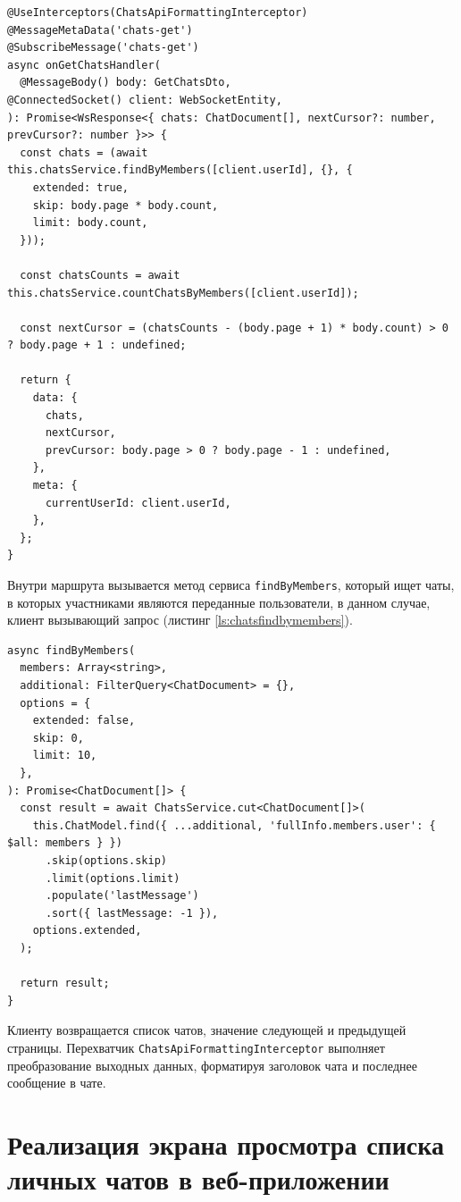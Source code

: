 \begin{lstlisting}[caption={Определение шлюза модуля, обеспечивающего работу с чатами}, label={ls:chatsget}]
@UseInterceptors(ChatsApiFormattingInterceptor)
@MessageMetaData('chats-get')
@SubscribeMessage('chats-get')
async onGetChatsHandler(
  @MessageBody() body: GetChatsDto,
@ConnectedSocket() client: WebSocketEntity,
): Promise<WsResponse<{ chats: ChatDocument[], nextCursor?: number, prevCursor?: number }>> {
  const chats = (await this.chatsService.findByMembers([client.userId], {}, {
    extended: true,
    skip: body.page * body.count,
    limit: body.count,
  }));

  const chatsCounts = await this.chatsService.countChatsByMembers([client.userId]);

  const nextCursor = (chatsCounts - (body.page + 1) * body.count) > 0 ? body.page + 1 : undefined;

  return {
    data: {
      chats,
      nextCursor,
      prevCursor: body.page > 0 ? body.page - 1 : undefined,
    },
    meta: {
      currentUserId: client.userId,
    },
  };
}
\end{lstlisting}

Внутри маршрута вызывается метод сервиса \verb|findByMembers|, который ищет чаты, в которых участниками являются переданные пользователи, в данном случае, клиент вызывающий запрос (листинг \ref{ls:chatsfindbymembers}).

\begin{lstlisting}[caption={Метод поиска чатов по переданным участникам}, label={ls:chatsfindbymembers}]
async findByMembers(
  members: Array<string>,
  additional: FilterQuery<ChatDocument> = {},
  options = {
    extended: false,
    skip: 0,
    limit: 10,
  },
): Promise<ChatDocument[]> {
  const result = await ChatsService.cut<ChatDocument[]>(
    this.ChatModel.find({ ...additional, 'fullInfo.members.user': { $all: members } })
      .skip(options.skip)
      .limit(options.limit)
      .populate('lastMessage')
      .sort({ lastMessage: -1 }),
    options.extended,
  );

  return result;
}
\end{lstlisting}

Клиенту возвращается список чатов, значение следующей и предыдущей страницы. Перехватчик \verb|ChatsApiFormattingInterceptor| выполняет преобразование выходных данных, форматируя заголовок чата и последнее сообщение в чате.

\section{Реализация экрана просмотра списка личных чатов в веб-приложении}

